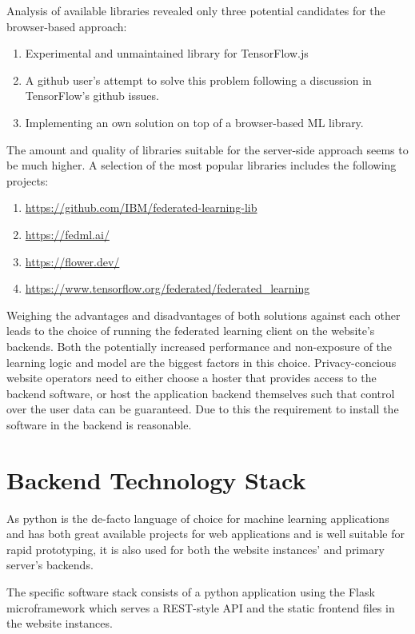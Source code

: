 \documentclass[
    fontsize=12pt,
    headings=small,
    parskip=half,           %
    bibliography=totoc,
    numbers=noenddot,       %
    open=any,               %
    final                   %
    ]{scrreprt}
\begin{document}
Analysis of available libraries revealed only three potential candidates for the browser-based approach:

\begin{enumerate}
	\item Experimental and unmaintained library for TensorFlow.js \cite{PAIRFL2019}
	\item A github user's attempt \cite{SaFL2019} to solve this problem following a discussion in TensorFlow's github issues.
	\item Implementing an own solution on top of a browser-based ML library.
\end{enumerate}

The amount and quality of libraries suitable for the server-side approach seems to be much higher. A selection of the most popular libraries includes the following projects:

\begin{enumerate}
	\item \url{https://github.com/IBM/federated-learning-lib}
	\item \url{https://fedml.ai/}
	\item \url{https://flower.dev/}
	\item \url{https://www.tensorflow.org/federated/federated_learning}
\end{enumerate}

Weighing the advantages and disadvantages of both solutions against each other leads to the choice of running the federated learning client on the website's backends. Both the potentially increased performance and non-exposure of the learning logic and model are the biggest factors in this choice. Privacy-concious website operators need to either choose a hoster that provides access to the backend software, or host the application backend themselves such that control over the user data can be guaranteed. Due to this the requirement to install the software in the backend is reasonable.

\section{Backend Technology Stack}

As python is the de-facto language of choice for machine learning applications and has both great available projects for web applications and is well suitable for rapid prototyping, it is also used for both the website instances' and primary server's backends.

The specific software stack consists of a python application using the Flask microframework which serves a REST-style API and the static frontend files in the website instances.
\end{document}
